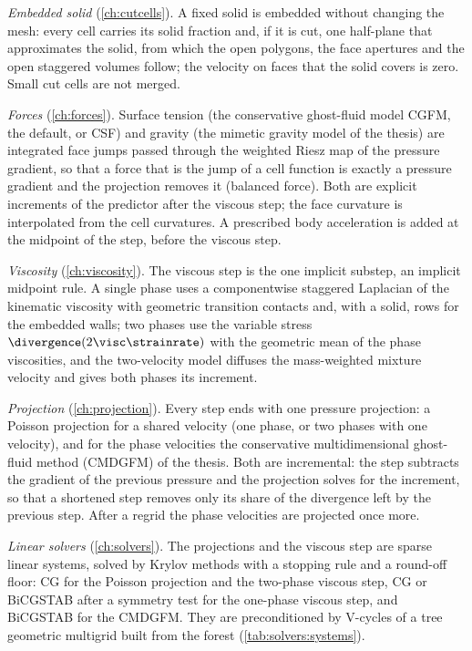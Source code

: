 \emph{Embedded solid} (\cref{ch:cutcells}). A fixed solid is embedded
without changing the mesh: every cell carries its solid fraction and, if it
is cut, one half-plane that approximates the solid, from which the open
polygons, the face apertures and the open staggered volumes follow; the
velocity on faces that the solid covers is zero. Small cut cells are not
merged.

\emph{Forces} (\cref{ch:forces}). Surface tension (the conservative
ghost-fluid model CGFM, the default, or CSF) and gravity (the mimetic gravity
model of the thesis) are integrated face jumps passed through the weighted
Riesz map of the pressure gradient, so that a force that is the jump of a
cell function is exactly a pressure gradient and the projection removes it
(balanced force). Both are explicit increments of the predictor after the
viscous step; the face curvature is interpolated from the cell curvatures. A
prescribed body acceleration is added at the midpoint of the step, before
the viscous step.

\emph{Viscosity} (\cref{ch:viscosity}). The viscous step is the one implicit
substep, an implicit midpoint rule. A single phase uses a componentwise
staggered Laplacian of the kinematic viscosity with geometric transition
contacts and, with a solid, rows for the embedded walls; two phases use the
variable stress $\divergence(2\visc\strainrate)$ with the geometric mean
of the phase viscosities, and the two-velocity model diffuses the
mass-weighted mixture velocity and gives both phases its increment.

\emph{Projection} (\cref{ch:projection}). Every step ends with one pressure
projection: a Poisson projection for a shared velocity (one phase, or two
phases with one velocity), and for the phase velocities the conservative
multidimensional ghost-fluid method (CMDGFM) of the thesis. Both are
incremental: the step subtracts the gradient of the previous pressure and the
projection solves for the increment, so that a shortened step removes only
its share of the divergence left by the previous step. After a regrid the
phase velocities are projected once more.

\emph{Linear solvers} (\cref{ch:solvers}). The projections and the viscous
step are sparse linear systems, solved by Krylov
methods with a stopping rule and a round-off floor: CG for the Poisson
projection and the two-phase viscous step, CG or
BiCGSTAB after a symmetry test for the one-phase viscous step, and BiCGSTAB
for the CMDGFM. They are preconditioned by
V-cycles of a tree geometric multigrid built from the forest
(\cref{tab:solvers:systems}).

